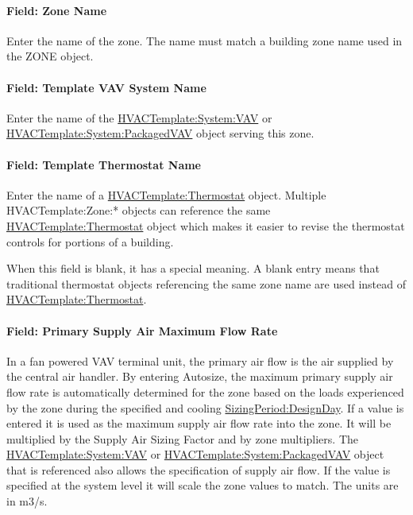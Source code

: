 \paragraph{Field: Zone Name}\label{field-zone-name-2016-06-16-1620}

Enter the name of the zone. The name must match a building zone name used in the ZONE object.

\paragraph{Field: Template VAV System Name}\label{field-template-vav-system-name-1}

Enter the name of the \hyperref[hvactemplatesystemvav]{HVACTemplate:System:VAV} or \hyperref[hvactemplatesystempackagedvav]{HVACTemplate:System:PackagedVAV} object serving this zone.

\paragraph{Field: Template Thermostat Name}\label{field-template-thermostat-name-9}

Enter the name of a \hyperref[hvactemplatethermostat]{HVACTemplate:Thermostat} object. Multiple HVACTemplate:Zone:* objects can reference the same \hyperref[hvactemplatethermostat]{HVACTemplate:Thermostat} object which makes it easier to revise the thermostat controls for portions of a building.

When this field is blank, it has a special meaning. A blank entry means that traditional thermostat objects referencing the same zone name are used instead of \hyperref[hvactemplatethermostat]{HVACTemplate:Thermostat}.

\paragraph{Field: Primary Supply Air Maximum Flow Rate}\label{field-primary-supply-air-maximum-flow-rate}

In a fan powered VAV terminal unit, the primary air flow is the air supplied by the central air handler. By entering Autosize, the maximum primary supply air flow rate is automatically determined for the zone based on the loads experienced by the zone during the specified and cooling \hyperref[sizingperioddesignday]{SizingPeriod:DesignDay}. If a value is entered it is used as the maximum supply air flow rate into the zone. It will be multiplied by the Supply Air Sizing Factor and by zone multipliers. The \hyperref[hvactemplatesystemvav]{HVACTemplate:System:VAV} or \hyperref[hvactemplatesystempackagedvav]{HVACTemplate:System:PackagedVAV} object that is referenced also allows the specification of supply air flow. If the value is specified at the system level it will scale the zone values to match. The units are in m3/s.

